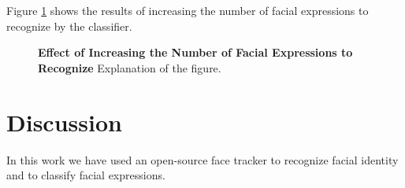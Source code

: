 \documentclass[]{article}
\begin{document}
Figure \ref{increasingNumberExpressions} shows the results of increasing the number of facial expressions to recognize
by the classifier.

\begin{figure}[ht]
\begin{center}
\vspace{-3mm}
\end{center}
\caption{\textbf{Effect of Increasing the Number of Facial Expressions to Recognize} Explanation of the figure.}
\label{increasingNumberExpressions}
\end{figure}

\section{Discussion}
In this work we have used an open-source face tracker to recognize facial identity and to classify facial expressions.




\end{document}
